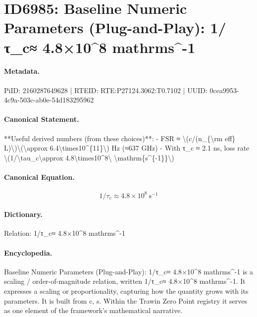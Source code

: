 \section*{ID6985: Baseline Numeric Parameters (Plug-and-Play): 1/τ\_c≈ 4.8×10\textasciicircum{}8 mathrms\textasciicircum{}-1}
\paragraph{Metadata.}
PiID: 2160287649628 | RTEID: RTE:P27124.3062:T0.7102 | UUID: 0cea9953-4c9a-503c-ab0e-54d183295962

\paragraph{Canonical Statement.}
**Useful derived numbers (from these choices)**: - FSR ≈ \textbackslash{}(c/(n\_\{\textbackslash{}rm eff\} L)\textbackslash{})\textbackslash{}(\textbackslash{}approx 6.4\textbackslash{}times10\textasciicircum{}\{11\}\textbackslash{}) Hz (≈637 GHz) - With τ\_c ≈ 2.1 ns, loss rate \textbackslash{}(1/\textbackslash{}tau\_c\textbackslash{}approx 4.8\textbackslash{}times10\textasciicircum{}8\textbackslash{} \textbackslash{}mathrm\{s\textasciicircum{}\{-1\}\}\textbackslash{})

\paragraph{Canonical Equation.}
\[
1/\tau_c\approx 4.8\times10^8\ \mathrm{s^{-1}}
\]

\paragraph{Dictionary.}
Relation: 1/τ\_c≈ 4.8×10\textasciicircum{}8 mathrms\textasciicircum{}-1

\paragraph{Encyclopedia.}
Baseline Numeric Parameters (Plug-and-Play): 1/τ\_c≈ 4.8×10\textasciicircum{}8 mathrms\textasciicircum{}-1 is a scaling / order-of-magnitude relation, written 1/τ\_c≈ 4.8×10\textasciicircum{}8 mathrms\textasciicircum{}-1. It expresses a scaling or proportionality, capturing how the quantity grows with its parameters. It is built from c, s. Within the Trawin Zero Point registry it serves as one element of the framework's mathematical narrative.

